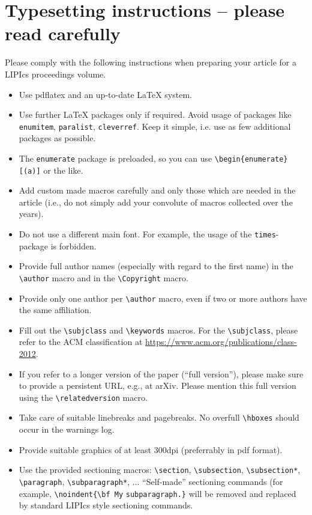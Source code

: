 \documentclass[a4paper,USenglish,english]{lipics-v2018}
\begin{document}
\section{Typesetting instructions -- please read carefully}
Please comply with the following instructions when preparing your article for a LIPIcs proceedings volume. 
\begin{itemize}
\item Use pdflatex and an up-to-date LaTeX system.
\item Use further LaTeX packages only if required. Avoid usage of packages like \verb+enumitem+, \verb+paralist+, \verb+cleverref+. Keep it simple, i.e. use as few additional packages as possible.
\item  The \texttt{enumerate} package is preloaded, so you can use
 \verb+\begin{enumerate}[(a)]+ or the like.
\item Add custom made macros carefully and only those which are needed in the article (i.e., do not simply add your convolute of macros collected over the years).
\item Do not use a different main font. For example, the usage of the \verb+times+-package is forbidden.
\item Provide full author names (especially with regard to the first name) in the \verb+\author+ macro and in the \verb+\Copyright+ macro.
\item Provide only one author per \verb+\author+ macro, even if two or more authors have the same affiliation.
\item Fill out the \verb+\subjclass+ and \verb+\keywords+ macros. For the \verb+\subjclass+, please refer to the ACM classification at \url{https://www.acm.org/publications/class-2012}.
\item If you refer to a longer version of the paper (``full version''), please make sure to provide a persistent URL, e.g., at arXiv. Please  mention this full version using the \verb+\relatedversion+ macro.
\item Take care of suitable linebreaks and pagebreaks. No overfull \verb+\hboxes+ should occur in the warnings log.
\item Provide suitable graphics of at least 300dpi (preferrably in pdf format).
\item Use the provided sectioning macros: \verb+\section+, \verb+\subsection+, \verb+\subsection*+, \verb+\paragraph+, \verb+\subparagraph*+, ... ``Self-made'' sectioning commands (for example, \verb+\noindent{\bf My+ \verb+subparagraph.}+ will be removed and replaced by standard LIPIcs style sectioning commands.

\end{itemize}
\end{document}
